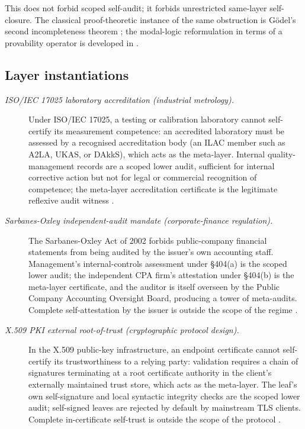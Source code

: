 \documentclass[11pt]{article}
\theoremstyle{definition}
\begin{document}
This does not forbid scoped self-audit; it forbids unrestricted
same-layer self-closure.  The classical proof-theoretic instance of
the same obstruction is G\"odel's second incompleteness theorem
\citep{Godel1931Unentscheidbare}; the modal-logic reformulation in
terms of a provability operator is developed in
\citet{Boolos1993LogicProvability}.

\subsection*{Layer instantiations}\label{layer-inst:F21}

\begin{description}
\item[\emph{{ISO}/{IEC} 17025 laboratory accreditation
(industrial metrology).}]
Under ISO/IEC 17025, a testing or calibration laboratory
cannot self-certify its measurement competence: an
accredited laboratory must be assessed by a recognised
accreditation body (an ILAC member such as A2LA, UKAS, or
DAkkS), which acts as the meta-layer.  Internal
quality-management records are a scoped lower audit,
sufficient
for internal corrective action but not for legal or
commercial recognition of competence; the meta-layer
accreditation certificate is the legitimate reflexive
audit witness \citep{ISOIEC17025_2017}.

\item[\emph{Sarbanes-Oxley independent-audit mandate
(corporate-finance regulation).}]
The Sarbanes-Oxley Act of 2002 forbids public-company
financial statements from being audited by the issuer's
own accounting staff.  Management's internal-controls
assessment under \S404(a) is the scoped lower audit; the
independent CPA firm's attestation under \S404(b) is the
meta-layer certificate, and the auditor is itself
overseen by the Public Company Accounting Oversight
Board, producing a tower of meta-audits.  Complete
self-attestation by the issuer is outside the scope of
the regime \citep{SarbanesOxley2002Act}.

\item[\emph{X.509 PKI external root-of-trust
(cryptographic protocol design).}]
In the X.509 public-key infrastructure, an endpoint
certificate cannot self-certify its trustworthiness to a
relying party: validation requires a chain of signatures
terminating at a root certificate authority in the
client's externally maintained trust store, which acts
as the meta-layer.  The leaf's own self-signature and
local syntactic integrity checks are the scoped lower
audit; self-signed leaves are rejected by default by
mainstream TLS clients.  Complete in-certificate
self-trust is outside the scope of the protocol
\citep{Cooper2008RFC5280}.


\end{description}
\end{document}
